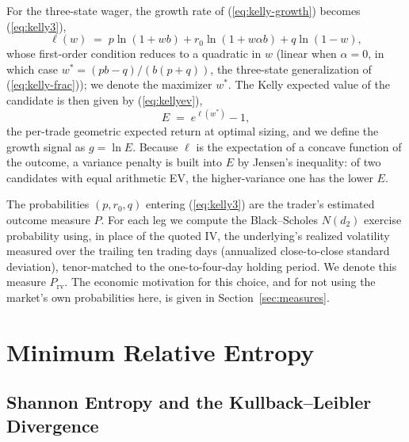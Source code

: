 \documentclass[11pt]{article}
\begin{document}
For the three-state wager, the growth rate of (\ref{eq:kelly-growth}) becomes
(\ref{eq:kelly3}),
\begin{equation}
\ell(w) \;=\; p \ln(1 + wb) + r_0 \ln(1 + w\alpha b) + q \ln(1 - w),
\label{eq:kelly3}
\end{equation}
whose first-order condition reduces to a quadratic in $w$ (linear when
$\alpha = 0$, in which case $w^\ast = (pb - q)/(b(p+q))$, the three-state
generalization of (\ref{eq:kelly-frac})); we denote the maximizer $w^\ast$. The Kelly expected value of the candidate is then given
by (\ref{eq:kellyev}),
\begin{equation}
E \;=\; e^{\ell(w^\ast)} - 1,
\label{eq:kellyev}
\end{equation}
the per-trade geometric expected return at optimal sizing, and we define the
growth signal as $g = \ln E$. Because $\ell$ is the expectation of a concave
function of the outcome, a variance penalty is built into $E$ by Jensen's
inequality: of two candidates with equal arithmetic EV, the higher-variance
one has the lower $E$.

The probabilities $(p, r_0, q)$ entering (\ref{eq:kelly3}) are the trader's
estimated outcome measure $P$. For each leg we compute the Black--Scholes
$N(d_2)$ exercise probability \cite{blackscholes1973} using, in place of the
quoted IV, the underlying's realized volatility measured over the trailing
ten trading days (annualized close-to-close standard deviation),
tenor-matched to the one-to-four-day holding period. We denote this measure
$P_{\mathrm{rv}}$. The economic motivation for this choice, and for not using
the market's own probabilities here, is given in
Section~\ref{sec:measures}.

\section{Minimum Relative Entropy}
\label{sec:relent}

\subsection{Shannon Entropy and the Kullback--Leibler Divergence}
\end{document}
